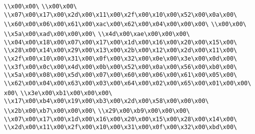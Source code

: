 \verb|\\x00\x00\|\newline
\verb|\\x00\x00\|\newline
\verb|\\x07\x00\x17\x00\x2d\x00\x11\x00\x2f\x00\x10\x00\x52\x00\x0a\x00\|\newline
\verb|\\x60\x00\x06\x00\x61\x00\xac\x00\x62\x00\x04\x00\x00\x00\|\newline
\verb|\\x00\x00\|\newline
\verb|\\x5a\x00\xad\x00\x00\x00\|\newline
\verb|\\x4d\x00\xae\x00\x00\x00\|\newline
\verb|\\x04\x00\x18\x00\x07\x00\x17\x00\x1d\x00\x16\x00\x20\x00\x15\x00\|\newline
\verb|\\x28\x00\x14\x00\x29\x00\x13\x00\x2b\x00\x12\x00\x2d\x00\x11\x00\|\newline
\verb|\\x2f\x00\x10\x00\x31\x00\x0f\x00\x32\x00\x0e\x00\x3e\x00\x0d\x00\|\newline
\verb|\\x3f\x00\x0c\x00\x4d\x00\x0b\x00\x52\x00\x0a\x00\x56\x00\xb0\x00\|\newline
\verb|\\x5a\x00\x08\x00\x5d\x00\x07\x00\x60\x00\x06\x00\x61\x00\x05\x00\|\newline
\verb|\\x62\x00\x04\x00\x63\x00\x03\x00\x64\x00\x02\x00\x65\x00\x01\x00\x00\x00\|\newline
\verb|\\x3e\x00\xb1\x00\x00\x00\|\newline
\verb|\\x17\x00\xb4\x00\x19\x00\xb3\x00\x2d\x00\x58\x00\x00\x00\|\newline
\verb|\\x2b\x00\xb7\x00\x00\x00\|\newline
\verb|\\x29\x00\xb9\x00\x00\x00\|\newline
\verb|\\x07\x00\x17\x00\x1d\x00\x16\x00\x20\x00\x15\x00\x28\x00\x14\x00\|\newline
\verb|\\x2d\x00\x11\x00\x2f\x00\x10\x00\x31\x00\x0f\x00\x32\x00\xbd\x00\|\newline
